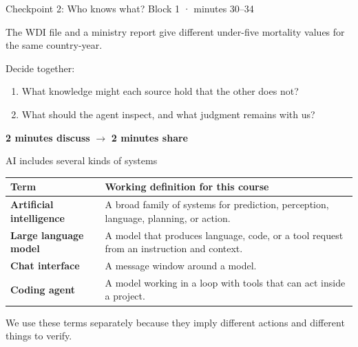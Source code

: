 \begin{frame}{Checkpoint 2: Who knows what?}
  \alert{Block 1 · minutes 30--34}

  \vspace{0.55em}
  The WDI file and a ministry report give different under-five mortality values
  for the same country-year.

  \vspace{0.55em}
  Decide together:
  \begin{enumerate}
    \item What knowledge might each source hold that the other does not?
    \item What should the agent inspect, and what judgment remains with us?
  \end{enumerate}

  \vfill
  \begin{center}
    \textbf{2 minutes discuss} \hspace{2.0em} $\longrightarrow$ \hspace{2.0em}
    \textbf{2 minutes share}
  \end{center}
\end{frame}

\begin{frame}{AI includes several kinds of systems}
  \small
  \begin{tabularx}{\textwidth}{@{}>{\bfseries}p{3.0cm}X@{}}
    \toprule
    Term & Working definition for this course \\
    \midrule
    Artificial intelligence & A broad family of systems for prediction, perception, language, planning, or action. \\
    Large language model & A model that produces language, code, or a tool request from an instruction and context. \\
    Chat interface & A message window around a model. \\
    Coding agent & A model working in a loop with tools that can act inside a project. \\
    \bottomrule
  \end{tabularx}

  \vfill
  We use these terms separately because they imply different actions and
  different things to verify.
\end{frame}

